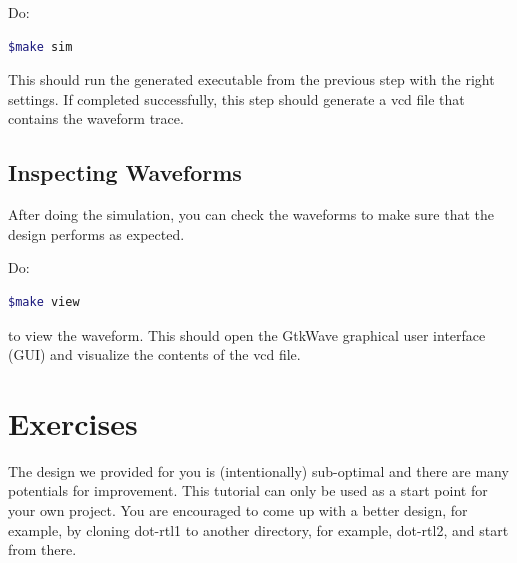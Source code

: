 \documentclass[12pt]{article}
\begin{document}
Do:

\begin{lstlisting}[language=bash]
$make sim
\end{lstlisting}

This should run the generated executable from the previous step with
the right settings. If completed successfully, this step should
generate a vcd file that contains the waveform trace.

\subsection{Inspecting Waveforms}

After doing the simulation, you can check the waveforms to make
sure that the design performs as expected.

Do: 

\begin{lstlisting}[language=bash]
$make view
\end{lstlisting}

to view the waveform. This should open the GtkWave graphical user interface (GUI)
and visualize the contents of the vcd file.

\section{Exercises}

The design we provided for you is (intentionally) sub-optimal and
there are many potentials for improvement. This tutorial can only be
used as a start point for your own project. You are encouraged to
come up with a better design, for example, by cloning dot-rtl1 to
another directory, for example, dot-rtl2, and start from there.
\end{document}
